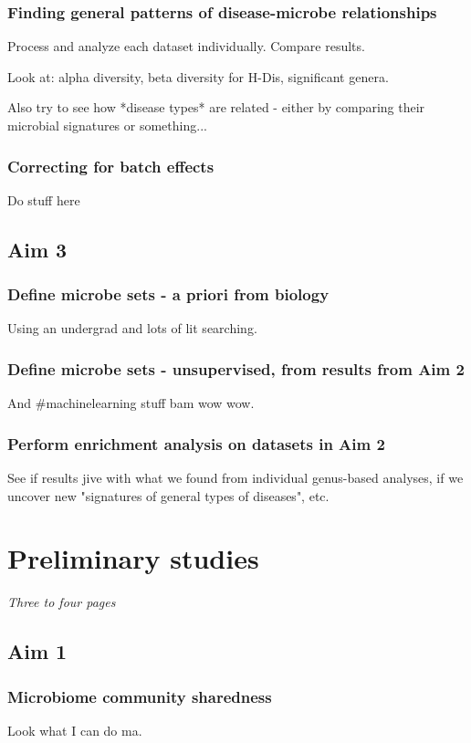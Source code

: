 \documentclass[12pt]{article}
\begin{document}
\subsubsection*{Finding general patterns of disease-microbe relationships}
Process and analyze each dataset individually. Compare results.

Look at: alpha diversity, beta diversity for H-Dis, significant genera.

Also try to see how *disease types* are related - either by comparing their microbial signatures or something...

\subsubsection*{Correcting for batch effects}
Do stuff here

\subsection*{Aim 3}

\subsubsection*{Define microbe sets - a priori from biology}
Using an undergrad and lots of lit searching.

\subsubsection*{Define microbe sets - unsupervised, from results from Aim 2}
And \#machinelearning stuff bam wow wow.

\subsubsection*{Perform enrichment analysis on datasets in Aim 2}
See if results jive with what we found from individual genus-based analyses, if we uncover new "signatures of general types of diseases", etc.

\section*{Preliminary studies}
\textit{Three to four pages}

\subsection*{Aim 1}
\subsubsection*{Microbiome community sharedness}
Look what I can do ma.
\end{document}
